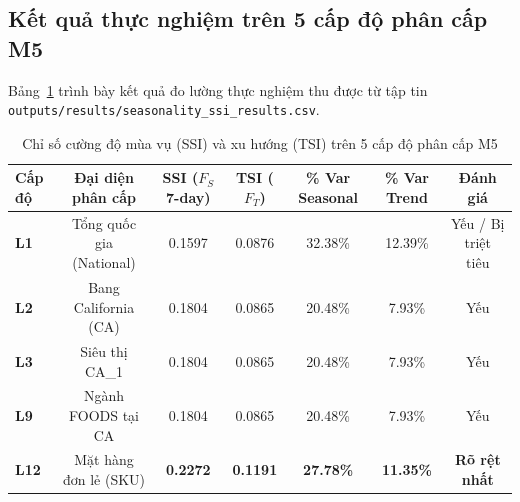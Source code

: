 \documentclass[12pt,a4paper,oneside]{article}
\begin{document}
\subsection{Kết quả thực nghiệm trên 5 cấp độ phân cấp M5}

Bảng~\ref{tab:ssi_results} trình bày kết quả đo lường thực nghiệm thu được từ tập tin \texttt{outputs/results/seasonality\_ssi\_results.csv}.

\begin{table}[htbp]
\centering
\caption{Chỉ số cường độ mùa vụ (SSI) và xu hướng (TSI) trên 5 cấp độ phân cấp M5}
\label{tab:ssi_results}
\begin{tabular}{lcccccc}
\toprule
\textbf{Cấp độ} & \textbf{Đại diện phân cấp} & \textbf{SSI ($F_S$ 7-day)} & \textbf{TSI ($F_T$)} & \textbf{\% Var Seasonal} & \textbf{\% Var Trend} & \textbf{Đánh giá} \\
\midrule
\textbf{L1} & Tổng quốc gia (National) & 0.1597 & 0.0876 & 32.38\% & 12.39\% & Yếu / Bị triệt tiêu \\
\textbf{L2} & Bang California (CA)     & 0.1804 & 0.0865 & 20.48\% & 7.93\%  & Yếu \\
\textbf{L3} & Siêu thị CA\_1           & 0.1804 & 0.0865 & 20.48\% & 7.93\%  & Yếu \\
\textbf{L9} & Ngành FOODS tại CA       & 0.1804 & 0.0865 & 20.48\% & 7.93\%  & Yếu \\
\textbf{L12}& Mặt hàng đơn lẻ (SKU)    & \textbf{0.2272} & \textbf{0.1191} & \textbf{27.78\%} & \textbf{11.35\%} & \textbf{Rõ rệt nhất} \\
\bottomrule
\end{tabular}
\end{table}
\end{document}
